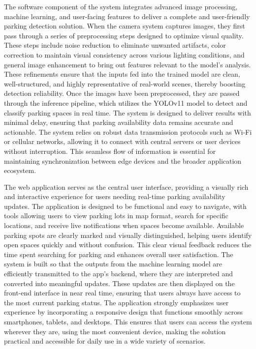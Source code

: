 \documentclass[conference]{IEEEtran}
\begin{document}
The software component of the system integrates advanced image processing, 
machine learning, 
and user-facing features to deliver a complete and user-friendly parking detection solution. 
When the camera system captures images, 
they first pass through a series of preprocessing steps designed to optimize visual quality. 
These steps include noise reduction to eliminate unwanted artifacts, 
color correction to maintain visual consistency across various lighting conditions, 
and general image enhancement to bring out features relevant to the model’s analysis. 
These refinements ensure that the inputs fed into the trained model are clean, 
well-structured, 
and highly representative of real-world scenes, 
thereby boosting detection reliability. 
Once the images have been preprocessed, 
they are passed through the inference pipeline, 
which utilizes the YOLOv11 model to detect and classify parking spaces in real time. 
The system is designed to deliver results with minimal delay, 
ensuring that parking availability data remains accurate and actionable. 
The system relies on robust data transmission protocols such as Wi-Fi or cellular networks, 
allowing it to connect with central servers or user devices without interruption. 
This seamless flow of information is essential for maintaining synchronization between edge devices and the broader application ecosystem.

The web application serves as the central user interface, 
providing a visually rich and interactive experience for users needing real-time parking availability updates. 
The application is designed to be functional and easy to navigate, 
with tools allowing users to view parking lots in map format, 
search for specific locations, 
and receive live notifications when spaces become available. 
Available parking spots are clearly marked and visually distinguished, 
helping users identify open spaces quickly and without confusion. 
This clear visual feedback reduces the time spent searching for parking and enhances overall user satisfaction. 
The system is built so that the outputs from the machine learning model are efficiently transmitted to the app’s backend, 
where they are interpreted and converted into meaningful updates. 
These updates are then displayed on the front-end interface in near real time, 
ensuring that users always have access to the most current parking status. 
The application strongly emphasizes user experience by incorporating a responsive design that functions smoothly across smartphones, 
tablets, 
and desktops. 
This ensures that users can access the system wherever they are, 
using the most convenient device, making the solution practical and accessible for daily use in a wide variety of scenarios.
\end{document}
